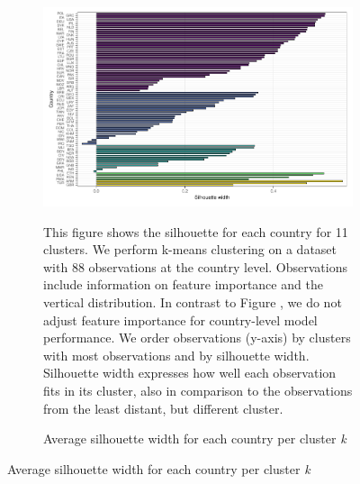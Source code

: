  \begin{figure}[ht!]\ContinuedFloat
   \centering
   \begin{subfigure}[b]{\textwidth}
   \centering
   \includegraphics{Figures_Appendix/Figure_Silhouette_Clusters_1.pdf}
   \caption{Average silhouette width for each country per cluster \textit{k}} \label{fig:G2_silhouette}
   \begin{subcaption2}
     This figure shows the silhouette for each country for 11 clusters. We perform k-means clustering on a dataset with 88 observations at the country level. Observations include information on feature importance and the vertical distribution. In contrast to Figure , we do not adjust feature importance for country-level model performance. We order observations (y-axis) by clusters with most observations and by silhouette width. Silhouette width expresses how well each observation fits in its cluster, also in comparison to the observations from the least distant, but different cluster.
   \end{subcaption2}
   \end{subfigure}
 \end{figure}
 \clearpage

